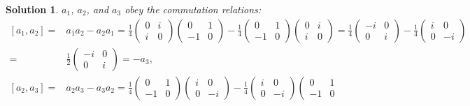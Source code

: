 \documentclass[UTF8,10pt,a4paper]{article}
\theoremstyle{Problem}
\theoremstyle{Solution}
\newtheorem*{sol}{Solution}
\begin{document}
\begin{sol}
    $a_1$, $a_2$, and $a_3$ obey the commutation relations:
    \begin{align}
        \nonumber[a_1,a_2]=&a_1a_2-a_2a_1=\frac{1}{4}\left(\begin{matrix}
            0&i\\
            i&0
        \end{matrix}\right)\left(\begin{matrix}
            0&1\\
            -1&0
        \end{matrix}\right)-\frac{1}{4}\left(\begin{matrix}
            0&1\\
            -1&0
        \end{matrix}\right)\left(\begin{matrix}
            0&i\\
            i&0
        \end{matrix}\right)=\frac{1}{4}\left(\begin{matrix}
            -i&0\\
            0&i
        \end{matrix}\right)-\frac{1}{4}\left(\begin{matrix}
            i&0\\
            0&-i
        \end{matrix}\right)\\
        =&\frac{1}{2}\left(\begin{matrix}
            -i&0\\
            0&i
        \end{matrix}\right)=-a_3,\\
        \nonumber[a_2,a_3]=&a_2a_3-a_3a_2=\frac{1}{4}\left(\begin{matrix}
            0&1\\
            -1&0
        \end{matrix}\right)\left(\begin{matrix}
            i&0\\
            0&-i
        \end{matrix}\right)-\frac{1}{4}\left(\begin{matrix}
            i&0\\
            0&-i
        \end{matrix}\right)\left(\begin{matrix}
            0&1\\
            -1&0

\end{matrix}
\end{align}
\end{sol}
\end{document}
